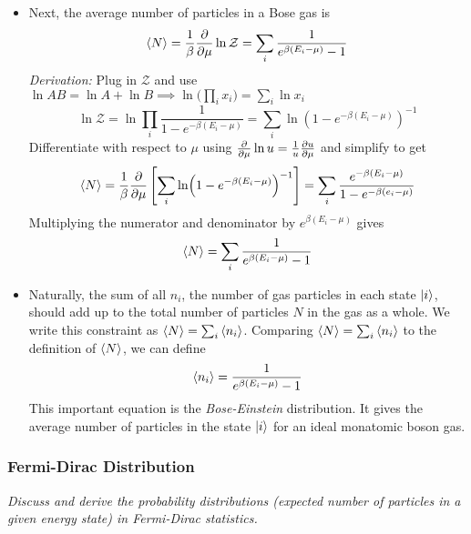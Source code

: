 \documentclass[11pt, a4paper]{article}
\begin{document}
\begin{itemize}
	\item Next, the average number of particles in a Bose gas is
	\begin{equation*}
		\expval{N} = \frac{1}{\beta} \pdv{}{\mu} \ln \mathcal{Z} = \sum_{i}\frac{1}{e^{\beta(E_{i} - \mu)} - 1}
	\end{equation*}
	\textit{Derivation:} Plug in $ \mathcal{Z} $ and use $ \ln AB = \ln A + \ln B \implies  \ln \big(\prod_{i}x_{i} \big)= \sum_{i} \ln x_{i} $
	\begin{equation*}
		\ln \mathcal{Z} = \ln \prod_{i} \frac{1}{1 - e^{-\beta (E_{i} - \mu)}} = \sum_{i} \ln (1 - e^{-\beta (E_{i} - \mu)})^{-1}
	\end{equation*} 
	Differentiate with respect to $ \mu $ using $ \pdv{}{\mu}\ln u = \frac{1}{u} \pdv{u}{\mu} $ and simplify to get
	\begin{align*}
		\expval{N} = \frac{1}{\beta} \pdv{}{\mu} \left[\sum_{i} \ln (1 - e^{-\beta (E_{i} - \mu)})^{-1}\right] = \sum_{i} \frac{e^{-\beta(E_{i} - \mu)}}{1 - e^{-\beta(e_{i} - \mu)}}
	\end{align*}
	Multiplying the numerator and denominator by $ e^{\beta(E_{i} - \mu)} $ gives
	\begin{equation*}
		\expval{N} = \sum_{i}\frac{1}{e^{\beta(E_{i} - \mu)} - 1}
	\end{equation*}
	
	\item Naturally, the sum of all $ n_{i} $, the number of gas particles in each state $ \ket{i} $, should add up to the total number of particles $ N $ in the gas as a whole. We write this constraint as $ \expval{N} = \sum_{i}\expval{n_{i}} $. Comparing $ \expval{N} = \sum_{i}\expval{n_{i}} $ to the definition of $ \expval{N} $, we can define
	\begin{equation*}
		\expval{n_{i}} = \frac{1}{e^{\beta(E_{i} - \mu)} - 1}
	\end{equation*}
	This important equation is the \textit{Bose-Einstein} distribution. It gives the average number of particles in the state $ \ket{i} $ for an ideal monatomic boson gas. 
	
\end{itemize}

\subsubsection{Fermi-Dirac Distribution}
\textit{Discuss and derive the probability distributions (expected number of particles in a given energy state) in Fermi-Dirac statistics.}
\end{document}
